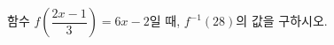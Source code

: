 \hspace*{2mm}\begin{minipage}[t]{\dimexpr\linewidth-2mm\relax}\vspace{0pt}
함수 $f\left(\dfrac{2x-1}{3}\right)=6x-2$일 때, $f^{-1}(28)$의 값을 구하시오.\end{minipage}
